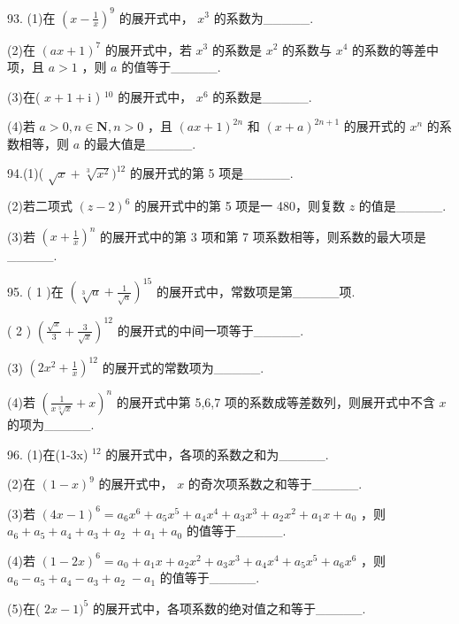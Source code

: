 \documentclass[10pt]{article}
\begin{document}
93. (1)在 \({\left( x - \frac{1}{x}\right) }^{9}\) 的展开式中， \({x}^{3}\) 的系数为\_\_\_\_\_.

(2)在 \({\left( ax + 1\right) }^{7}\) 的展开式中，若 \({x}^{3}\) 的系数是 \({x}^{2}\) 的系数与 \({x}^{4}\) 的系数的等差中项，且 \(a > 1\) ，则 \(a\) 的值等于\_\_\_\_\_.

(3)在( \(x + 1 + \mathrm{i}\) ) \({}^{10}\) 的展开式中， \({x}^{6}\) 的系数是\_\_\_\_\_.

(4)若 \(a > 0,n \in  \mathbf{N},n > 0\) ，且 \({\left( ax + 1\right) }^{2n}\) 和 \({\left( x + a\right) }^{{2n} + 1}\) 的展开式的 \({x}^{n}\) 的系数相等，则 \(a\) 的最大值是\_\_\_\_\_.

94.(1)( \(\sqrt{x} + \sqrt[3]{{x}^{2}}{)}^{12}\) 的展开式的第 5 项是\_\_\_\_\_.

(2)若二项式 \({\left( z - 2\right) }^{6}\) 的展开式中的第 5 项是一 480，则复数 \(z\) 的值是\_\_\_\_\_.

(3)若 \({\left( x + \frac{1}{x}\right) }^{n}\) 的展开式中的第 3 项和第 7 项系数相等，则系数的最大项是\_\_\_\_\_.

95. ( 1 )在 \({\left( \sqrt[3]{a} + \frac{1}{\sqrt{a}}\right) }^{15}\) 的展开式中，常数项是第\_\_\_\_\_项.

( 2 ) \({\left( \frac{\sqrt{x}}{3} + \frac{3}{\sqrt{x}}\right) }^{12}\) 的展开式的中间一项等于\_\_\_\_\_.

(3) \({\left( 2{x}^{2} + \frac{1}{x}\right) }^{12}\) 的展开式的常数项为\_\_\_\_\_.

(4)若 \({\left( \frac{1}{x\sqrt[3]{x}} + x\right) }^{n}\) 的展开式中第 5,6,7 项的系数成等差数列，则展开式中不含 \(x\) 的项为\_\_\_\_\_.

96. (1)在(1-3x) \({}^{12}\) 的展开式中，各项的系数之和为\_\_\_\_\_.

(2)在 \({\left( 1 - x\right) }^{9}\) 的展开式中， \(x\) 的奇次项系数之和等于\_\_\_\_\_.

(3)若 \({\left( 4x - 1\right) }^{6} = {a}_{6}{x}^{6} + {a}_{5}{x}^{5} + {a}_{4}{x}^{4} + {a}_{3}{x}^{3} + {a}_{2}{x}^{2} + {a}_{1}x + {a}_{0}\) ，则 \({a}_{6} + {a}_{5} + {a}_{4} + {a}_{3} + {a}_{2} \; + {a}_{1} + {a}_{0}\) 的值等于\_\_\_\_\_.

(4)若 \({\left( 1 - 2x\right) }^{6} = {a}_{0} + {a}_{1}x + {a}_{2}{x}^{2} + {a}_{3}{x}^{3} + {a}_{4}{x}^{4} + {a}_{5}{x}^{5} + {a}_{6}{x}^{6}\) ，则 \({a}_{6} - {a}_{5} + {a}_{4} - {a}_{3} + {a}_{2} \; - {a}_{1}\) 的值等于\_\_\_\_\_.

(5)在( \({2x} - 1{)}^{5}\) 的展开式中，各项系数的绝对值之和等于\_\_\_\_\_.
\end{document}
